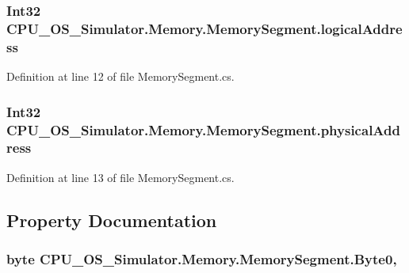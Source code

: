 \subsubsection[{logical\+Address}]{\setlength{\rightskip}{0pt plus 5cm}Int32 C\+P\+U\+\_\+\+O\+S\+\_\+\+Simulator.\+Memory.\+Memory\+Segment.\+logical\+Address\hspace{0.3cm}{\ttfamily [private]}}\label{class_c_p_u___o_s___simulator_1_1_memory_1_1_memory_segment_a27b4e22dcb1789a77734671f6d90e62e}


Definition at line 12 of file Memory\+Segment.\+cs.

\hypertarget{class_c_p_u___o_s___simulator_1_1_memory_1_1_memory_segment_a0477db48e8386456f2bd08632fd4508b}{}
\subsubsection[{physical\+Address}]{\setlength{\rightskip}{0pt plus 5cm}Int32 C\+P\+U\+\_\+\+O\+S\+\_\+\+Simulator.\+Memory.\+Memory\+Segment.\+physical\+Address\hspace{0.3cm}{\ttfamily [private]}}\label{class_c_p_u___o_s___simulator_1_1_memory_1_1_memory_segment_a0477db48e8386456f2bd08632fd4508b}


Definition at line 13 of file Memory\+Segment.\+cs.



\subsection{Property Documentation}
\hypertarget{class_c_p_u___o_s___simulator_1_1_memory_1_1_memory_segment_af1355b8170ad0461d479785ff6e1420d}{}
\subsubsection[{Byte0}]{\setlength{\rightskip}{0pt plus 5cm}byte C\+P\+U\+\_\+\+O\+S\+\_\+\+Simulator.\+Memory.\+Memory\+Segment.\+Byte0\hspace{0.3cm}{\ttfamily [get]}, {\ttfamily [set]}}\label{class_c_p_u___o_s___simulator_1_1_memory_1_1_memory_segment_af1355b8170ad0461d479785ff6e1420d}


